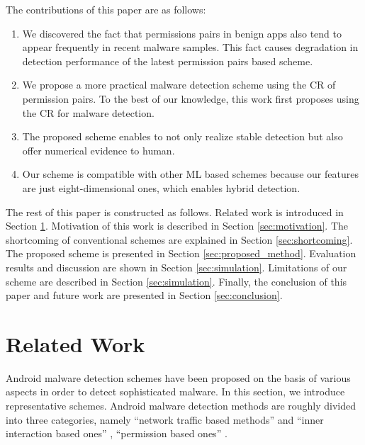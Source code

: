 \documentclass{ieeeaccess}
\begin{document}
The contributions of this paper are as follows:
\begin{enumerate}
  \item We discovered the fact that permissions pairs in benign apps also tend to appear frequently in recent malware samples.
    This fact causes degradation in detection performance of the latest permission pairs based scheme.
  \item We propose a more practical malware detection scheme using the CR of permission pairs. 
    To the best of our knowledge, this work first proposes using the CR for malware detection.
  \item The proposed scheme enables to not only realize stable detection but also offer numerical evidence to human.
  \item Our scheme is compatible with other ML based schemes because our features are just eight-dimensional ones, which enables hybrid detection.
\end{enumerate}

The rest of this paper is constructed as follows. 
Related work is introduced in Section \ref{sec:related_work}.
Motivation of this work is described in Section \ref{sec:motivation}.
The shortcoming of conventional schemes are explained in Section \ref{sec:shortcoming}.
The proposed scheme is presented in Section \ref{sec:proposed_method}.
Evaluation results and discussion are shown in Section \ref{sec:simulation}.
Limitations of our scheme are described in Section \ref{sec:simulation}.
Finally, the conclusion of this paper and future work are presented in Section \ref{sec:conclusion}.

\section{Related Work} \label{sec:related_work}
Android malware detection schemes have been proposed on the basis of various aspects in order to detect sophisticated malware.
In this section, we introduce representative schemes.
Android malware detection methods are roughly divided into three categories, namely ``network traffic based methods'' \cite{wang2018detecting,garg2017network} and ``inner interaction based ones'' \cite{aafer2013droidapiminer, deshotels2014droidlegacy, xu2016iccdetector, cai2018droidcat}, ``permission based ones''  \cite{sanz2013puma, li2018significant, liang2014permission, liu2014two, arora2019permpair}.
\end{document}

